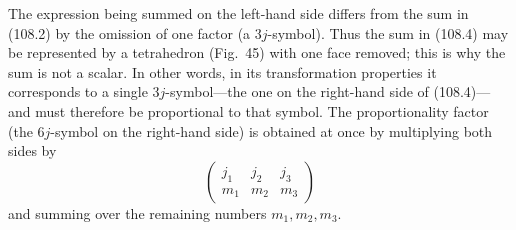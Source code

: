 The expression being summed on the left-hand side differs from the sum in (108.2) by the omission of one factor (a $3j$-symbol). Thus the sum in (108.4) may be represented by a tetrahedron (Fig.~45) with one face removed; this is why the sum is not a scalar. In other words, in its transformation properties it corresponds to a single $3j$-symbol---the one on the right-hand side of (108.4)---and must therefore be proportional to that symbol. The proportionality factor (the $6j$-symbol on the right-hand side) is obtained at once by multiplying both sides by
\[
\begin{pmatrix}j_1&j_2&j_3\\m_1&m_2&m_3\end{pmatrix}
\]
and summing over the remaining numbers $m_1,m_2,m_3$.
